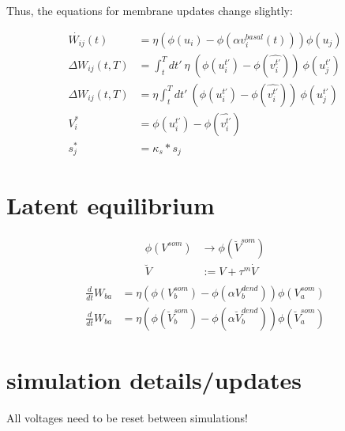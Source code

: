 Thus, the equations for membrane updates change slightly:

\begin{align}
  \dot{W_{ij}}(t)    & = \eta (\phi(u_i) - \phi(\alpha v^{basal}_i(t))) \phi(u_j)                             \\
  \Delta W_{ij}(t,T) & = \int_t^T dt' \ \eta \  (\phi(u_i^{t'}) - \phi(\widehat{v_i^{t'}})) \  \phi(u_j^{t'}) \\
  \Delta W_{ij}(t,T) & = \eta \int_t^T dt' \  (\phi(u_i^{t'}) - \phi(\widehat{v_i^{t'}})) \ \phi(u_j^{t'})    \\
  V_i^*              & = \phi(u_i^{t'}) - \phi(\widehat{v_i^{t'}})                                            \\
  s_j^*              & = \kappa_s * s_j
\end{align}



\section{Latent equilibrium}

\begin{align}
  \phi(V^{som}) & \rightarrow \phi(\breve{V}^{som}) \\
  \breve{V}     & := V + \tau^m \dot{V}             \\
\end{align}
\begin{align}
  \frac{d}{dt} W_{ba} & = \eta (\phi(V_b^{som}) - \phi(\alpha V_b^{dend})) \phi(V_a^{som})                         \\
  \frac{d}{dt} W_{ba} & = \eta (\phi(\breve{V}_b^{som}) - \phi(\alpha \breve{V}_b^{dend})) \phi(\breve{V}_a^{som})
\end{align}


\section{simulation details/updates}

All voltages need to be reset between simulations!

